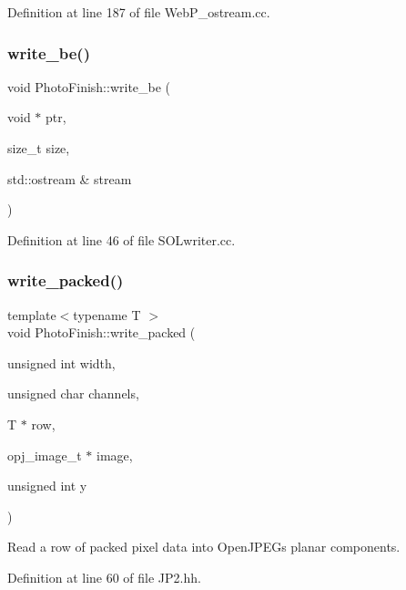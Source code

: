Definition at line 187 of file Web\+P\+\_\+ostream.\+cc.

\mbox{\label{namespace_photo_finish_a7c41a48ae64ffaae2d2514c7c713d171}} 
\subsubsection{\texorpdfstring{write\+\_\+be()}{write\_be()}}
{\footnotesize\ttfamily void Photo\+Finish\+::write\+\_\+be (\begin{DoxyParamCaption}\item[{void $\ast$}]{ptr,  }\item[{size\+\_\+t}]{size,  }\item[{std\+::ostream \&}]{stream }\end{DoxyParamCaption})}



Definition at line 46 of file S\+O\+Lwriter.\+cc.

\mbox{\label{namespace_photo_finish_a5935e449413495c7af9504e518d0921b}} 
\subsubsection{\texorpdfstring{write\+\_\+packed()}{write\_packed()}}
{\footnotesize\ttfamily template$<$typename T $>$ \\
void Photo\+Finish\+::write\+\_\+packed (\begin{DoxyParamCaption}\item[{unsigned int}]{width,  }\item[{unsigned char}]{channels,  }\item[{T $\ast$}]{row,  }\item[{opj\+\_\+image\+\_\+t $\ast$}]{image,  }\item[{unsigned int}]{y }\end{DoxyParamCaption})}



Read a row of packed pixel data into Open\+J\+P\+EG\textquotesingle{}s planar components. 



Definition at line 60 of file J\+P2.\+hh.


